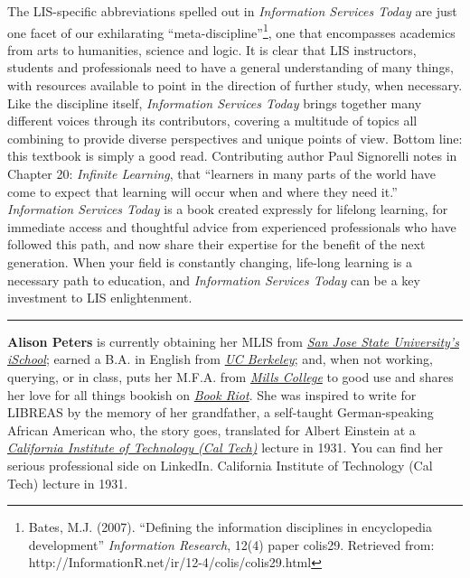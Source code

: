 \documentclass[a4paper,
fontsize=11pt,
oneside,
numbers=noperiodatend,
parskip=half-,
bibliography=totoc,
final
]{scrartcl}
\begin{document}
The LIS-specific abbreviations spelled out in \emph{Information Services
Today} are just one facet of our exhilarating
\enquote{meta-discipline}\footnote{Bates, M.J. (2007). \enquote{Defining
  the information disciplines in encyclopedia development}
  \emph{Information Research}, 12(4) paper colis29. Retrieved from:
  http://InformationR.net/ir/12-4/colis/colis29.html}, one that
encompasses academics from arts to humanities, science and logic. It is
clear that LIS instructors, students and professionals need to have a
general understanding of many things, with resources available to point
in the direction of further study, when necessary. Like the discipline
itself, \emph{Information Services Today} brings together many different
voices through its contributors, covering a multitude of topics all
combining to provide diverse perspectives and unique points of view.
Bottom line: this textbook is simply a good read. Contributing author
Paul Signorelli notes in Chapter 20: \emph{Infinite Learning}, that
\enquote{learners in many parts of the world have come to expect that
learning will occur when and where they need it.} \emph{Information
Services Today} is a book created expressly for lifelong learning, for
immediate access and thoughtful advice from experienced professionals
who have followed this path, and now share their expertise for the
benefit of the next generation. When your field is constantly changing,
life-long learning is a necessary path to education, and
\emph{Information Services Today} can be a key investment to LIS
enlightenment.

\begin{center}\rule{0.5\linewidth}{\linethickness}\end{center}

\textbf{Alison Peters} is currently obtaining her MLIS from
\href{http://ischool.sjsu.edu/}{\emph{San Jose State University's
iSchool}}; earned a B.A. in English from
\href{http://berkeley.edu/}{\emph{UC Berkeley}}; and, when not working,
querying, or in class, puts her M.F.A. from
\href{http://www.mills.edu/}{\emph{Mills College}} to good use and
shares her love for all things bookish on
\href{http://bookriot.com/}{\emph{Book Riot}}. She was inspired to write
for LIBREAS by the memory of her grandfather, a self-taught
German-speaking African American who, the story goes, translated for
Albert Einstein at a \href{http://www.caltech.edu/}{\emph{California
Institute of Technology (Cal Tech)}} lecture in 1931. You can find her
serious professional side on LinkedIn. California Institute of
Technology (Cal Tech) lecture in 1931.
\end{document}
